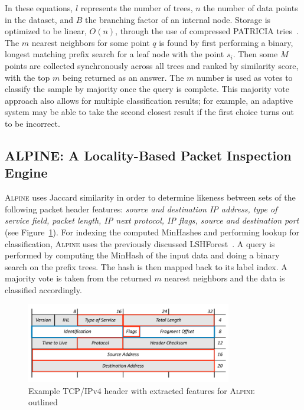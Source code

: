In these equations, $l$ represents the number of trees, $n$ the number of data points in the dataset, and $B$ the branching factor of an internal node. Storage is optimized to be linear, $O(n)$, through the use of compressed PATRICIA tries~\cite{lshforest}. The $m$ nearest neighbors for some point $q$ is found by first performing a binary, longest matching prefix search for a leaf node with the point $s_i$. Then some $M$ points are collected synchronously across all trees and ranked by similarity score, with the top $m$ being returned as an answer. The $m$ number is used as votes to classify the sample by majority once the query is complete. This majority vote approach also allows for multiple classification results; for example, an adaptive system may be able to take the second closest result if the first choice turns out to be incorrect.

\subsection{ALPINE: A Locality-Based Packet Inspection Engine}
 \textsc{Alpine} uses Jaccard similarity in order to determine likeness between sets of the following packet header features: \textit{source and destination IP address, type of service field, packet length, IP next protocol, IP flags, source and destination port} (see Figure~\ref{fig:alpineheader}). For indexing the computed MinHashes and performing lookup for classification, \textsc{Alpine} uses the previously discussed LSHForest~\cite{lshforest}. A query is performed by computing the MinHash of the input data and doing a binary search on the prefix trees. The hash is then mapped back to its label index. A majority vote is taken from the returned $m$ nearest neighbors and the data is classified accordingly.

\begin{figure} [ht!]
  \centering
  \includegraphics[width=0.8\textwidth]{chapters/4/img/alpineheader.png}
  \caption{Example TCP/IPv4 header with extracted features for \textsc{Alpine} outlined}
  \label{fig:alpineheader}
\end{figure}

